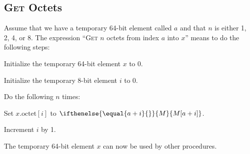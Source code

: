 \documentclass[a4paper,12pt]{article}
\newcommand{\MEM}[1]{\ifthenelse{\equal{#1}{}}{M}{M[#1]}}
\newcommand{\octno}[2]{#1.\mathrm{octet}[#2]}
\newcommand{\proc}[1]{\textsc{#1}}
\begin{document}
\subsection{\proc{Get} Octets}

Assume that we have a temporary 64-bit element called $a$ and that $n$ is either 1, 2, 4, or 8.
The expression ``\proc{Get} $n$ octets from index $a$ into $x$'' means to do the following steps:
\begin{stepnumbers}
\item Initialize the temporary 64-bit element $x$ to 0.
\item Initialize the temporary 8-bit element $i$ to 0.
\item Do the following $n$ times:
  \begin{stepletters}
  \item Set $\octno{x}{i}$ to $\MEM{a+i}$.
  \item Increment $i$ by 1.
  \end{stepletters}
\end{stepnumbers}
The temporary 64-bit element $x$ can now be used by other procedures.
\end{document}
